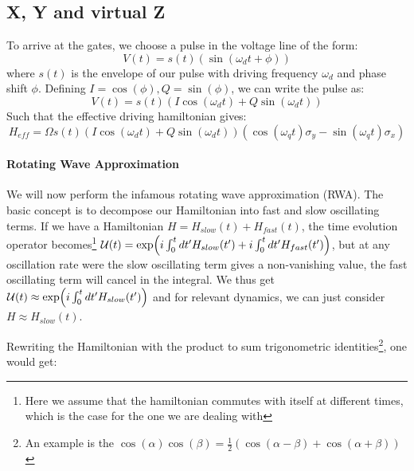\subsection{X, Y and virtual Z}\label{sec:how_to_make_gates}
To arrive at the gates, we choose a pulse in the voltage line of the form:
\begin{equation}
    V(t) = s(t) (\sin(\omega_d t + \phi))
\end{equation}
where $s(t)$ is the envelope of our pulse with driving frequency $\omega_d$ and phase shift $\phi$. Defining $I = \cos(\phi), Q = \sin(\phi)$, we can write the pulse as:
\begin{equation}
    V(t) = s(t) \left(I \cos(\omega_d t) + Q \sin(\omega_d t)\right) 
\end{equation}
Such that the effective driving hamiltonian gives:
\begin{equation}
    H_{eff} = \Omega s(t) \left(I \cos(\omega_d t) + Q \sin(\omega_d t)\right)   \left(\cos(\omega_q t)\sigma_y - \sin(\omega_q t) \sigma_x \right)
\end{equation}


\paragraph{Rotating Wave Approximation} We will now perform the infamous rotating wave approximation (RWA). The basic concept is to decompose our Hamiltonian into fast and slow oscillating terms. If we have a Hamiltonian $H = H_{slow}(t) + H_{fast}(t)$, the time evolution operator becomes\footnote{Here we assume that the hamiltonian commutes with itself at different times, which is the case for the one we are dealing with} $\mathcal{U}(t) = \exp(i\int_0^tdt'H_{slow}(t') + i\int_0^tdt'H_{fast}(t'))$, but at any oscillation rate were the slow oscillating term gives a non-vanishing value, the fast oscillating term will cancel in the integral. We thus get $\mathcal{U}(t) \approx \exp(i\int_0^tdt'H_{slow}(t'))$ and for relevant dynamics, we can just consider $H\approx H_{slow}(t)$. 

Rewriting the Hamiltonian with the product to sum trigonometric identities\footnote{An example is the $\cos(\alpha)\cos(\beta)=\frac{1}{2}(\cos(\alpha-\beta) + \cos(\alpha + \beta))$}, one would get: 

